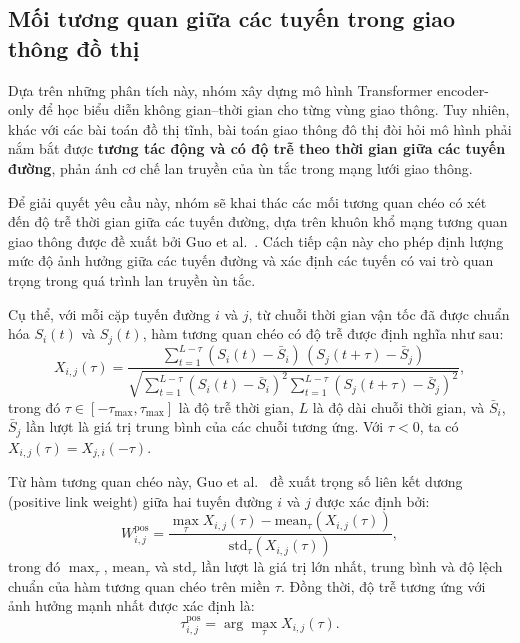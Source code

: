 \subsection{Mối tương quan giữa các tuyến trong giao thông đồ thị}
Dựa trên những phân tích này, nhóm xây dựng mô hình Transformer encoder-only để học biểu
diễn không gian--thời gian cho từng vùng giao thông. Tuy nhiên, khác với các bài toán đồ thị tĩnh,
bài toán giao thông đô thị đòi hỏi mô hình phải nắm bắt được \textbf{tương tác động và có độ trễ theo
thời gian giữa các tuyến đường}, phản ánh cơ chế lan truyền của ùn tắc trong mạng lưới giao thông.

Để giải quyết yêu cầu này, nhóm sẽ khai thác các mối tương quan chéo có xét đến độ trễ thời gian
giữa các tuyến đường, dựa trên khuôn khổ mạng tương quan giao thông được đề xuất bởi Guo
et al.~\cite{guo2019identifying}. Cách tiếp cận này cho phép định lượng mức độ ảnh hưởng giữa
các tuyến đường và xác định các tuyến có vai trò quan trọng trong quá trình lan truyền ùn tắc.

Cụ thể, với mỗi cặp tuyến đường $i$ và $j$, từ chuỗi thời gian vận tốc đã được chuẩn hóa
$S_i(t)$ và $S_j(t)$, hàm tương quan chéo có độ trễ được định nghĩa như sau:
\begin{equation}
X_{i,j}(\tau) =
\frac{
\sum_{t=1}^{L-\tau} (S_i(t) - \bar{S}_i)\,(S_j(t+\tau) - \bar{S}_j)
}{
\sqrt{
\sum_{t=1}^{L-\tau} (S_i(t) - \bar{S}_i)^2
\sum_{t=1}^{L-\tau} (S_j(t+\tau) - \bar{S}_j)^2
}
},
\end{equation}
trong đó $\tau \in [-\tau_{\max}, \tau_{\max}]$ là độ trễ thời gian, $L$ là độ dài chuỗi thời gian,
và $\bar{S}_i$, $\bar{S}_j$ lần lượt là giá trị trung bình của các chuỗi tương ứng. Với $\tau < 0$,
ta có $X_{i,j}(\tau) = X_{j,i}(-\tau)$.

Từ hàm tương quan chéo này, Guo et al.~\cite{guo2019identifying} đề xuất trọng số liên kết dương
(positive link weight) giữa hai tuyến đường $i$ và $j$ được xác định bởi:
\begin{equation}
W^{\text{pos}}_{i,j} =
\frac{
\max_{\tau} X_{i,j}(\tau) - \text{mean}_{\tau} \left( X_{i,j}(\tau) \right)
}{
\text{std}_{\tau} \left( X_{i,j}(\tau) \right)
},
\end{equation}
trong đó $\max_{\tau}$, $\text{mean}_{\tau}$ và $\text{std}_{\tau}$ lần lượt là giá trị lớn nhất,
trung bình và độ lệch chuẩn của hàm tương quan chéo trên miền $\tau$. Đồng thời, độ trễ tương ứng
với ảnh hưởng mạnh nhất được xác định là:
\begin{equation}
\tau^{\text{pos}}_{i,j} = \arg\max_{\tau} X_{i,j}(\tau).
\end{equation}

